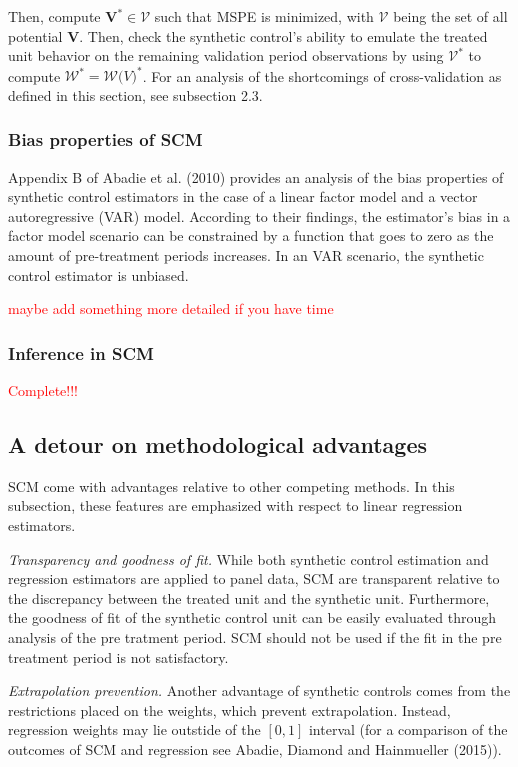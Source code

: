 \documentclass[12pt,a4paper,draft]{article}
\begin{document}
Then, compute $\mathbf{V}^* \in \mathcal{V}$ such that MSPE is minimized, with 
$\mathcal{V}$ being the set of all potential $\mathbf{V}$. Then, check the synthetic 
control's ability to emulate the treated unit behavior on the remaining validation 
period observations by using $\mathcal{V}^*$ to compute $\mathcal{W}^*=\mathcal{W} 
\mathcal(V)^*$.
\newline For an analysis of the shortcomings of cross-validation as defined in this 
section, see subsection 2.3.

\subsubsection{Bias properties of SCM}
Appendix B of Abadie et al. (2010) provides an analysis of the bias properties of synthetic 
control estimators in the case of a linear factor model and a vector autoregressive 
(VAR) model. According to their findings, the estimator's bias in a factor model 
scenario can be constrained by a function that goes to zero as the amount of 
pre-treatment periods increases. In an VAR scenario, the synthetic control 
estimator is unbiased.

\textcolor{red}{maybe add something more detailed if you have time} %


\subsubsection{Inference in SCM}
\textcolor{red}{Complete!!!} %

\subsection{A detour on methodological advantages}
SCM come with advantages relative to other competing methods. In this subsection, 
these features are emphasized with respect to linear regression estimators. 

\emph{Transparency and goodness of fit.} While both 
synthetic control estimation and regression estimators are applied to panel data, 
SCM are transparent relative to the discrepancy between the treated unit and the 
synthetic unit. Furthermore, the goodness of fit of the synthetic control unit 
can be easily evaluated through analysis of the pre tratment period. SCM should 
not be used if the fit in the pre treatment period is not satisfactory.

\emph{Extrapolation prevention.} Another advantage of synthetic controls comes from the 
restrictions placed on the weights, which prevent extrapolation. Instead, 
regression weights may lie outstide of the $[0,1]$ interval (for a comparison 
of the outcomes of SCM and regression see Abadie, Diamond and Hainmueller (2015)). 
\end{document}
